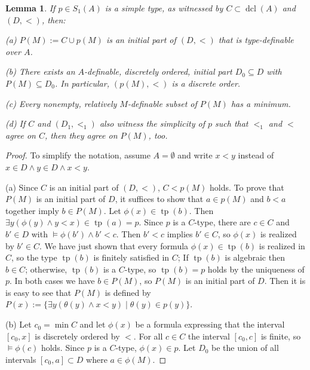 \documentclass[12pt]{amsart}
\newtheorem{Lemma}[Theorem]{Lemma}
\theoremstyle{definition}
\DeclareMathOperator{\dcl}{dcl}
\DeclareMathOperator{\tp}{tp}
\begin{document}
\begin{Lemma}\label{Lemma_basic_simple}
If   $p\in S_1(A)$ is a simple type, as witnessed by $C\subset\dcl(A)$ and $(D,<)$, then:

(a) $P(M):=C\cup p(M)$ is an initial part  of $(D,<)$ that is type-definable over $A$.

(b) There exists an  $A$-definable, discretely ordered, initial part $D_0\subseteq D$  with $P(M)\subseteq D_0$. In particular, $(p(M),<)$ is a discrete order.  

(c) Every nonempty, relatively $M$-definable subset of  $P(M)$ has a  minimum.  

(d) If $C$ and $(D_1,<_1)$ also witness the simplicity of $p$ such that $<_1$ and $<$ agree on $C$, then they agree on $P(M)$, too. 
\end{Lemma}
\begin{proof}To simplify the notation, assume $A=\emptyset$ and  write $x<y$ instead of $x\in D\land y\in D\land x<y$. 

(a) Since $C$ is an initial part of $(D,<)$,    $C<p(M)$ holds. 
To prove that $P(M)$ is an initial part of $D$, it suffices to show that $a\in p(M)$ and $b< a$ together imply $b\in P(M)$. Let $\phi(x)\in \tp(b)$. 
Then  $\exists y(\phi(y)\land y< x)\in\tp(a)=p$. Since $p$ is   a $C$-type, there are $c\in C$ and $b'\in D$ with $\models\phi(b')\land b'< c$.
Then $b'< c$ implies $b'\in C$, so   $\phi(x)$ is realized by $b'\in C$. We have just shown that every formula $\phi(x)\in \tp(b)$ is realized in $C$, so the type $\tp(b)$ is finitely satisfied in $C$; 
If $\tp(b)$ is algebraic  then $b\in C$; otherwise, $\tp (b)$ is a $C$-type, so $\tp(b)=p$ holds by the uniqueness of $p$.
In both cases we have $b\in P(M)$, so $P(M)$ is an initial part of $D$. Then it is is easy to see that $P(M)$ is defined by  $P(x):=\{\exists y(\theta(y) \land   x<y)\mid \theta(y)\in p(y)\}$. 

\smallskip
(b) Let $c_0=\min C$ and let $\phi(x)$ be a formula expressing that the interval $[c_0,x]$ is discretely ordered by $<$.  For all $c\in C$ the interval $[c_0,c]$ is finite, so $\models  \phi(c)$ holds. Since $p$ is a $C$-type, $\phi(x)\in p$. Let $D_0$ be the union of all intervals $[c_0,a]\subset D$ where $a\in\phi(M)$.  


\end{proof}
\end{document}
